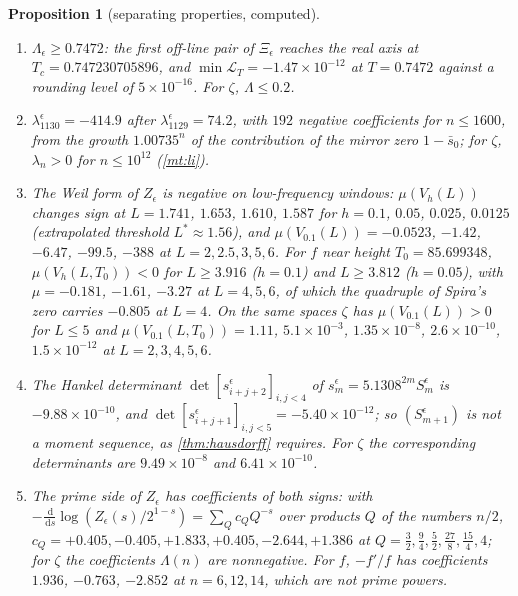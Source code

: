 \documentclass[11pt]{article}
\newtheorem{proposition}[theorem]{Proposition}
\theoremstyle{definition}\newtheorem{definition}[theorem]{Definition}
\theoremstyle{remark}\newtheorem{remark}[theorem]{Remark}
\newcommand{\dd}{\,\mathrm d}\newcommand{\e}{\mathrm e}
\begin{document}
\begin{proposition}[separating properties, computed]\label{prop:sepcomp}
\begin{enumerate}[label=(\roman*)]
\item $\Lambda_\epsilon\ge0.7472$: the first off-line pair of $\Xi_\epsilon$ reaches the real axis at $T_c=0.747230705896$, and $\min\mathcal L_T=-1.47\times10^{-12}$ at $T=0.7472$ against a rounding level of $5\times10^{-16}$. For $\zeta$, $\Lambda\le0.2$.
\item $\lambda^\epsilon_{1130}=-414.9$ after $\lambda^\epsilon_{1129}=74.2$, with $192$ negative coefficients for $n\le1600$, from the growth $1.00735^n$ of the contribution of the mirror zero $1-\bar s_0$; for $\zeta$, $\lambda_n>0$ for $n\le10^{12}$ (\cref{mt:li}).
\item The Weil form of $Z_\epsilon$ is negative on low-frequency windows: $\mu(V_h(L))$ changes sign at $L=1.741$, $1.653$, $1.610$, $1.587$ for $h=0.1$, $0.05$, $0.025$, $0.0125$ (extrapolated threshold $L^*\approx1.56$), and $\mu(V_{0.1}(L))=-0.0523$, $-1.42$, $-6.47$, $-99.5$, $-388$ at $L=2,2.5,3,5,6$. For $f$ near height $T_0=85.699348$, $\mu(V_h(L,T_0))<0$ for $L\ge3.916$ ($h=0.1$) and $L\ge3.812$ ($h=0.05$), with $\mu=-0.181$, $-1.61$, $-3.27$ at $L=4,5,6$, of which the quadruple of Spira's zero carries $-0.805$ at $L=4$. On the same spaces $\zeta$ has $\mu(V_{0.1}(L))>0$ for $L\le5$ and $\mu(V_{0.1}(L,T_0))=1.11$, $5.1\times10^{-3}$, $1.35\times10^{-8}$, $2.6\times10^{-10}$, $1.5\times10^{-12}$ at $L=2,3,4,5,6$.
\item The Hankel determinant $\det[s^\epsilon_{i+j+2}]_{i,j<4}$ of $s^\epsilon_m=5.1308^{2m}S^\epsilon_m$ is $-9.88\times10^{-10}$, and $\det[s^\epsilon_{i+j+1}]_{i,j<5}=-5.40\times10^{-12}$; so $(S^\epsilon_{m+1})$ is not a moment sequence, as \cref{thm:hausdorff} requires. For $\zeta$ the corresponding determinants are $9.49\times10^{-8}$ and $6.41\times10^{-10}$.
\item The prime side of $Z_\epsilon$ has coefficients of both signs: with $-\frac{\dd}{\dd s}\log(Z_\epsilon(s)/2^{1-s})=\sum_Qc_QQ^{-s}$ over products $Q$ of the numbers $n/2$, $c_Q=+0.405,-0.405,+1.833,+0.405,-2.644,+1.386$ at $Q=\frac32,\frac94,\frac52,\frac{27}8,\frac{15}4,4$; for $\zeta$ the coefficients $\Lambda(n)$ are nonnegative. For $f$, $-f'/f$ has coefficients $1.936$, $-0.763$, $-2.852$ at $n=6,12,14$, which are not prime powers.
\end{enumerate}
\end{proposition}
\end{document}
